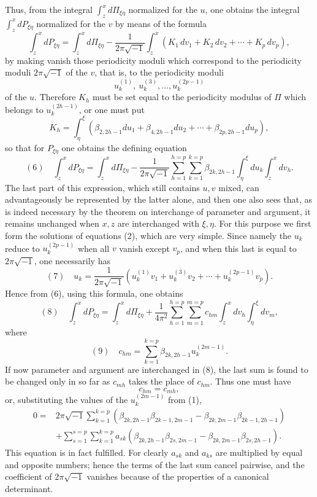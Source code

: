 \documentclass[10pt]{article}
\begin{document}
Thus, from the integral \(\int_z^x d\Pi_{\xi\eta}\) normalized for the \(u\), one obtains the integral \(\int_z^x dP_{\xi\eta}\) normalized for the \(v\) by means of the formula
\[
\int_z^x dP_{\xi\eta}
=
\int_z^x d\Pi_{\xi\eta}
-\frac{1}{2\pi\sqrt{-1}}
 \int_z^x(K_1\,dv_1+K_2\,dv_2+\cdots+K_p\,dv_p),
\]
by making vanish those periodicity moduli which correspond to the periodicity moduli \(2\pi\sqrt{-1}\) of the \(v\), that is, to the periodicity moduli
\[
u_k^{(1)},\ u_k^{(3)},\ldots,u_k^{(2p-1)}
\]
of the \(u\). Therefore \(K_h\) must be set equal to the periodicity modulus of \(\Pi\) which belongs to \(u_k^{(2h-1)}\), or one must put
\[
K_h=\int_{\eta}^{\xi}(\beta_{2,2h-1}du_1+\beta_{4,2h-1}du_2+\cdots+\beta_{2p,2h-1}du_p),
\]
so that for \(P_{\xi\eta}\) one obtains the defining equation
\[
(6)\quad
\int_z^x dP_{\xi\eta}
=
\int_z^x d\Pi_{\xi\eta}
-\frac{1}{2\pi\sqrt{-1}}
\sum_{h=1}^{h=p}\sum_{k=1}^{k=p}
\beta_{2k,2h-1}\int_{\eta}^{\xi}du_k\int_z^x dv_h.
\]
The last part of this expression, which still contains \(u,v\) mixed, can advantageously be represented by the latter alone, and then one also sees that, as is indeed necessary by the theorem on interchange of parameter and argument, it remains unchanged when \(x,z\) are interchanged with \(\xi,\eta\). For this purpose we first form the solutions of equations (2), which are very simple. Since namely the \(u_k\) reduce to \(u_k^{(2p-1)}\) when all \(v\) vanish except \(v_p\), and when this last is equal to \(2\pi\sqrt{-1}\), one necessarily has
\[
(7)\quad
u_k=\frac{1}{2\pi\sqrt{-1}}
\left(u_k^{(1)}v_1+u_k^{(3)}v_2+\cdots+u_k^{(2p-1)}v_p\right).
\]
Hence from (6), using this formula, one obtains
\[
(8)\quad
\int_z^x dP_{\xi\eta}
=
\int_z^x d\Pi_{\xi\eta}
+\frac{1}{4\pi^2}
\sum_{h=1}^{h=p}\sum_{m=1}^{m=p}
c_{hm}\int_z^x dv_h\int_{\eta}^{\xi}dv_m,
\]
where
\[
(9)\quad
c_{hm}=\sum_{k=1}^{k=p}\beta_{2k,2h-1}u_k^{(2m-1)}.
\]
If now parameter and argument are interchanged in (8), the last sum is found to be changed only in so far as \(c_{mh}\) takes the place of \(c_{hm}\). Thus one must have
\[
c_{hm}=c_{mh},
\]
or, substituting the values of the \(u_k^{(2m-1)}\) from (1),
\[
\begin{aligned}
0={}&2\pi\sqrt{-1}\sum_{k=1}^{k=p}
(\beta_{2k,2h-1}\beta_{2k-1,2m-1}
-\beta_{2k,2m-1}\beta_{2k-1,2h-1})\\
&+\sum_{s=1}^{s=p}\sum_{k=1}^{k=p}a_{sk}
(\beta_{2k,2h-1}\beta_{2s,2m-1}
-\beta_{2k,2m-1}\beta_{2s,2h-1}).
\end{aligned}
\]
This equation is in fact fulfilled. For clearly \(a_{sk}\) and \(a_{ks}\) are multiplied by equal and opposite numbers; hence the terms of the last sum cancel pairwise, and the coefficient of \(2\pi\sqrt{-1}\) vanishes because of the properties of a canonical determinant.
\end{document}
